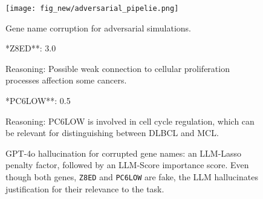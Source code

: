 \begin{figure}[htbp]
    \centering
    \texttt{[image: fig\_new/adversarial\_pipelie.png]}
    \scriptsize
    \caption{Gene name corruption for adversarial simulations.}
    \label{fig:adversarial-pipeline}
\end{figure}

\begin{figure}[htbp]
    \centering
    \begin{tcolorbox}[
        on line, colframe=darkgray,colback=pink,
        boxrule=0.8pt,arc=10pt,boxsep=0pt,left=6pt,
        right=6pt,top=6pt,bottom=6pt
    ]  
    \scriptsize **Z8ED**: 3.0
    
    Reasoning: Possible weak connection to cellular proliferation processes affection some cancers.
    \end{tcolorbox}
    
    \vspace{0.5em}
    \begin{tcolorbox}[
        on line, colframe=darkgray,colback=pink,
        boxrule=0.8pt,arc=10pt,boxsep=0pt,left=6pt,
        right=6pt,top=6pt,bottom=6pt
    ]  
    \scriptsize **PC6LOW**: 0.5
    
    Reasoning: PC6LOW is involved in cell cycle regulation, which can be relevant for distinguishing between DLBCL and MCL.
    \end{tcolorbox}
    
    \vspace{-0.5em}
    \caption{GPT-4o hallucination for corrupted gene names: an LLM-Lasso penalty factor, followed by an LLM-Score importance score.
    Even though both genes, \texttt{Z8ED} and \texttt{PC6LOW} are fake, the LLM hallucinates justification for their relevance to the task.}
    \label{fig:adversarial-hallucinations}
\end{figure}